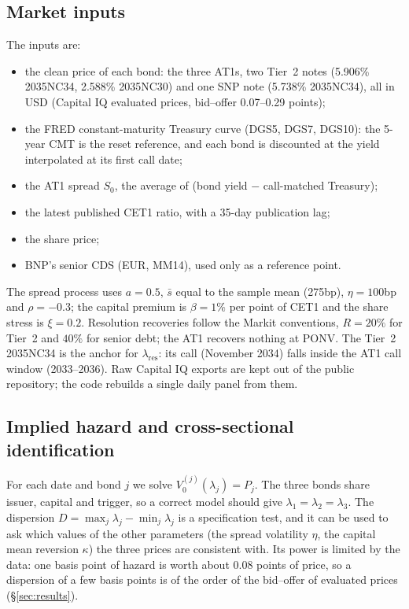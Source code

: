 \documentclass[11pt]{article}
\newcommand{\1}{\mathbf{1}}
\begin{document}
\subsection{Market inputs}
The inputs are:
\begin{itemize}
  \item the clean price of each bond: the three AT1s, two Tier~2 notes
  (5.906\% 2035NC34, 2.588\% 2035NC30) and one SNP note (5.738\% 2035NC34), all
  in USD (Capital IQ evaluated prices, bid--offer 0.07--0.29 points);
  \item the FRED constant-maturity Treasury curve (DGS5, DGS7, DGS10): the 5-year
  CMT is the reset reference, and each bond is discounted at the yield
  interpolated at its first call date;
  \item the AT1 spread $S_0$, the average of (bond yield $-$ call-matched Treasury);
  \item the latest published CET1 ratio, with a 35-day publication lag;
  \item the share price;
  \item BNP's senior CDS (EUR, MM14), used only as a reference point.
\end{itemize}
The spread process uses $a=0.5$, $\bar s$ equal to the sample mean (275bp),
$\eta=100$bp and $\rho=-0.3$; the capital premium is $\beta=1\%$ per point of CET1 and the share
stress is $\xi=0.2$. Resolution recoveries follow the Markit conventions,
$R=20\%$ for Tier~2 and $40\%$ for senior debt; the AT1 recovers nothing at
PONV. The Tier~2 2035NC34 is the anchor for $\lambda_{\mathrm{res}}$: its call
(November 2034) falls inside the AT1 call window (2033--2036). Raw Capital IQ
exports are kept out of the public repository; the code rebuilds a single daily
panel from them.

\subsection{Implied hazard and cross-sectional identification}
For each date and bond $j$ we solve $V_0^{(j)}(\lambda_j)=P_j$. The three bonds
share issuer, capital and trigger, so a correct model should give
$\lambda_1=\lambda_2=\lambda_3$. The dispersion
$D=\max_j\lambda_j-\min_j\lambda_j$ is a specification test, and it can be
used to ask which values of the other parameters (the spread volatility $\eta$,
the capital mean reversion $\kappa$) the three prices are consistent with. Its
power is limited by the data: one basis point of hazard is worth about $0.08$
points of price, so a dispersion of a few basis points is of the order of the
bid--offer of evaluated prices (\S\ref{sec:results}).
\end{document}
